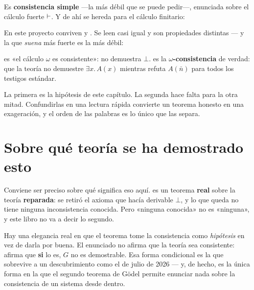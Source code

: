 

Es \textbf{consistencia simple} —la más débil que se puede pedir—, enunciada sobre el cálculo
fuerte $\vdash$. Y de ahí se hereda para el cálculo finitario:


\begin{muro}
En este proyecto conviven  y . Se leen casi igual y
son propiedades distintas — y la que \emph{suena} más fuerte es la más débil:


 es «el cálculo $\omega$ es consistente»: no demuestra $\bot$.
 es la \textbf{$\omega$-consistencia} de verdad: que la teoría no demuestre
$\exists x.\,A(x)$ mientras refuta $A(\bar n)$ para todos los testigos estándar.

La primera es la hipótesis de este capítulo. La segunda hace falta para la otra mitad. Confundirlas
en una lectura rápida convierte un teorema honesto en una exageración, y el orden de las palabras
es lo único que las separa.
\end{muro}

\section{Sobre qué teoría se ha demostrado esto}

\avisoreparacion

Conviene ser preciso sobre qué significa eso aquí.  es un teorema
\textbf{real} sobre la teoría \textbf{reparada}: se retiró el axioma que hacía derivable $\bot$, y
lo que queda no tiene ninguna inconsistencia conocida. Pero «ninguna conocida» no es «ninguna», y
este libro no va a decir lo segundo.

\begin{leccion}
Hay una elegancia real en que el teorema tome la consistencia como \emph{hipótesis} en vez de
darla por buena. El enunciado no afirma que la teoría sea consistente: afirma que
\textbf{si} lo es, $G$ no es demostrable. Esa forma condicional es la que sobrevive a un
descubrimiento como el de julio de 2026 — y, de hecho, es la única forma en la que el segundo
teorema de Gödel permite enunciar nada sobre la consistencia de un sistema desde dentro.
\end{leccion}

